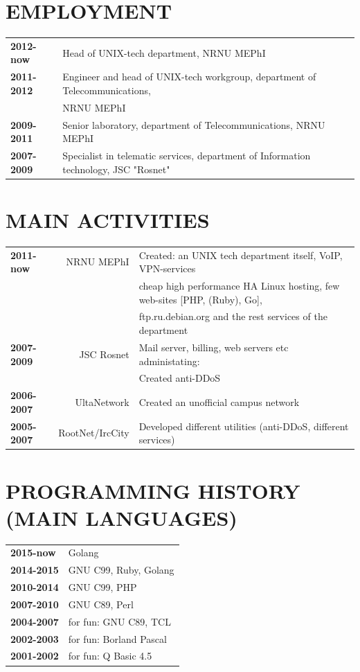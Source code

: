 \begin{resume}
\section{EMPLOYMENT}
\vspace{0.1in} 
\begin{tabular}{ll}
    {\bf 2012-now } & Head of UNIX-tech department, NRNU MEPhI\\
    {\bf 2011-2012} & Engineer and head of UNIX-tech workgroup, department of Telecommunications,\\
                    & NRNU MEPhI\\
    {\bf 2009-2011} & Senior laboratory, department of Telecommunications, NRNU MEPhI\\
    {\bf 2007-2009} & Specialist in telematic services, department of Information technology, JSC "Rosnet"\\
\end{tabular}

\section{MAIN ACTIVITIES}
\vspace{0.1in} 
\begin{tabular}{lrl}
    {\bf 2011-now } & NRNU MEPhI      & Created: an UNIX tech department itself, VoIP, VPN-services\\
                    &                 & cheap high performance HA Linux hosting, few web-sites [PHP, (Ruby), Go],\\
                    &                 & ftp.ru.debian.org and the rest services of the department\\
    {\bf 2007-2009} & JSC Rosnet      & Mail server, billing, web servers etc administating:\\
                    &                 & Created anti-DDoS\\
    {\bf 2006-2007} & UltaNetwork     & Created an unofficial campus network\\
    {\bf 2005-2007} & RootNet/IrcCity & Developed different utilities (anti-DDoS, different services)\\
\end{tabular}

\section{PROGRAMMING HISTORY (MAIN LANGUAGES)}
\vspace{0.1in} 
\begin{tabular}{ll}
{\bf 2015-now}  & Golang\\
{\bf 2014-2015} & GNU C99, Ruby, Golang\\
{\bf 2010-2014} & GNU C99, PHP\\
{\bf 2007-2010} & GNU C89, Perl\\
{\bf 2004-2007} & for fun: GNU C89, TCL\\
{\bf 2002-2003} & for fun: Borland Pascal\\
{\bf 2001-2002} & for fun: Q Basic 4.5\\
\end{tabular}


\end{resume}
